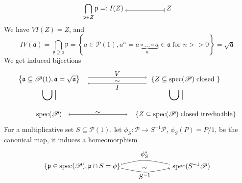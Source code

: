 \documentclass[leqno]{article}
\newcommand{\pid}{\mathfrak{p}}
\newcommand{\oneideal}{\mathfrak{a}}
\newcommand{\biop}{\mathscr{P}}
\numberwithin{equation}{section}
\begin{document}
\begin{equation*}
				\bigcap\limits_{\pid\in Z} \pid =: I(Z) \; \tikz \draw[<-|] (0mm,0mm)--(20mm,0mm);\; Z
\end{equation*}
We have $VI(Z)=Z$, and 
\begin{equation}
				IV(\oneideal)=\bigcap\limits_{\mathfrak{p}\supseteq \mathfrak{a}} \pid = \left\{ a\in \biop(1),
								a^{n}=\underbrace{a\circ\ldots \circ a }_{n} \in \oneideal\;\text{for $n>>0$}
\right\}=\sqrt{\oneideal}
\label{eq:5.11}
\end{equation}
We get induced bijections
\begin{equation}
				\begin{tikzpicture}[baseline=5mm]
								 \node at (35mm,6mm) {$\sim$};
								 \node at (10mm,5mm) {$\text{spec}(\biop)$}; 
								 \node at (80mm,5mm) {$\left\{ Z\subseteq\text{spec}(\biop)\;\text{closed irreducible} \right\}$}; 
								 \node at (10mm,15mm) {\rotatebox{90}{\Huge $\subseteq$}};
								 \node at (75mm,15mm) {\rotatebox{90}{\Huge $\subseteq$}};
								 \node at (80mm,23mm) {$\left\{ Z\subseteq\text{spec}(\biop)\;\text{closed } \right\}$}; 
								 \node at (10mm,23mm) {$\left\{ \oneideal\subseteq\biop(1),\oneideal=\sqrt{\oneideal} \right\}$}; 
								 \draw[->] (30mm,24mm)--(60mm,24mm);
								 \draw[arrows={<-}] (30mm,21mm)--(60mm,21mm);
								 \draw[arrows={<->}] (20mm,5mm)--(50mm,5mm);
								 \node at (45mm,26mm) {$V$};
								 \node at (45mm,22mm) {$\sim$};
								 \node at (45mm,19mm) {$I$};
				\end{tikzpicture}
				\label{eq:5.12}
\end{equation}
For a multiplicative set $S\subseteq \biop(1)$, let $\phi_{S}:\biop\rightarrow
S^{-1}\biop$, $\phi_{S}(P)=P/1$, be the canonical map, it induces a homeomorphism 
\begin{equation}
				\begin{tikzpicture}[baseline=5mm]
								 \node at (0mm,5mm) {$\left\{ \pid\in \text{spec}(\biop), \pid\cap S=\phi \right\}$};
								 \draw[<-] plot[smooth ] coordinates {(20mm,6mm)(32.5mm,8mm)(45mm,6mm)};
								 \draw[->] plot[smooth ] coordinates {(20mm,4mm)(32.5mm,2mm)(45mm,4mm)};
								 \node at (32mm,11mm) {$\phi_{S}^{\ast}$};
								 \node at (32mm,0mm) {$S^{-1}$};
								 \node at (32mm,4mm) {$\sim$};
								 \node at (56mm,5mm) {$\text{spec}(S^{-1}\biop)$};
				\end{tikzpicture}
				\label{eq:5.13}
\end{equation}
\end{document}

